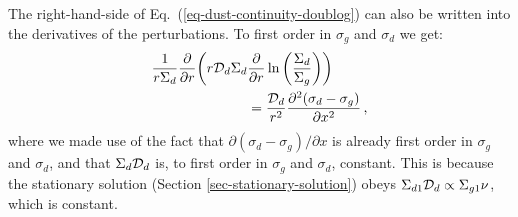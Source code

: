\documentclass{aa}
\def\comma{\,,}
\begin{document}
The right-hand-side of Eq.~(\ref{eq-dust-continuity-doublog}) can also
be written into the derivatives of the perturbations. To first order in
$\sigma_{g}$ and $\sigma_{d}$ we get:
\begin{equation}\label{eq-simplified-rhs}
\begin{split}
  \frac{1}{r\Sigma_d}\frac{\partial}{\partial r}
  \bigg(r{\cal D}_d  \Sigma_d & \frac{\partial}{\partial r} 
  \ln\bigg(\frac{\Sigma_d}{\Sigma_g}\bigg)\bigg)\\
  &= \frac{{\cal D}_d}{r^2}
  \frac{\partial^2 (\sigma_d-\sigma_g)}{\partial x^2}\comma
\end{split}
\end{equation}
where we made use of the fact that $\partial(\sigma_d-\sigma_g)/\partial x$ is
already first order in $\sigma_{g}$ and $\sigma_{d}$, and that $\Sigma_d{\cal
  D}_d$ is, to first order in $\sigma_{g}$ and $\sigma_{d}$, constant. This is
because the stationary solution (Section \ref{sec-stationary-solution}) obeys
$\Sigma_{d1}{\cal D}_d\propto \Sigma_{g1}\nu$, which is constant.
\end{document}
